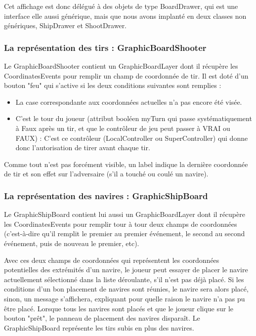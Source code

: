 	Cet affichage est donc délégué à des objets de type BoardDrawer, qui est une interface elle aussi générique, mais que nous avons implanté en deux classes non génériques, ShipDrawer et ShootDrawer.

\subsubsection{La représentation des tirs : GraphicBoardShooter}

	Le GraphicBoardShooter contient un GraphicBoardLayer dont il récupère les CoordinatesEvents pour remplir un champ de coordonnée de tir.
Il est doté d'un bouton "feu" qui s'active si les deux conditions suivantes sont remplies :
\begin{itemize}
\item La case correspondante aux coordonnées actuelles n'a pas encore été visée.
\item C'est le tour du joueur (attribut booléen myTurn qui passe systématiquement à Faux après un tir, et que le contrôleur de jeu peut passer à VRAI ou FAUX) : C'est ce contrôleur (LocalController ou SuperController) qui donne donc l'autorisation de tirer avant chaque tir.
\end{itemize}


Comme tout n'est pas forcément visible, un label indique la dernière coordonnée de tir et son effet sur l'adversaire (s'il a touché ou coulé un navire).

\subsubsection{La représentation des navires : GraphicShipBoard}

	Le GraphicShipBoard contient lui aussi un GraphicBoardLayer dont il récupère les CoordinatesEvents pour remplir tour à tour deux champs de coordonnées (c'est-à-dire qu'il remplit le premier au premier événement, le second au second événement, puis de nouveau le premier, etc). \newline
	
	Avec ces deux champs de coordonnées qui représentent les coordonnées potentielles des extrémités d'un navire, le joueur peut essayer de placer le navire actuellement sélectionné dans la liste déroulante, s'il n'est pas déjà placé.
Si les conditions d'un bon placement de navires sont réunies, le navire sera alors placé, sinon, un message s'affichera, expliquant pour quelle raison le navire n'a pas pu être placé.
\newline
	Lorsque tous les navires sont placés et que le joueur clique sur le bouton "prêt", le panneau de placement des navires disparaît.
	Le GraphicShipBoard représente les tirs subis en plus des navires.